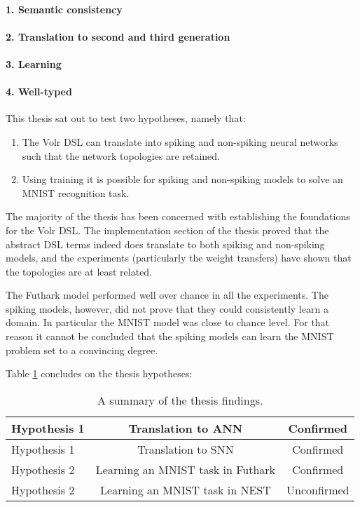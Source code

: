 \documentclass[report.tex]{subfiles}
\begin{document}
\paragraph{1. Semantic consistency}
\paragraph{2. Translation to second and third generation}
\paragraph{3. Learning}
\paragraph{4. Well-typed}

This thesis sat out to test two hypotheses, namely that:

\begin{enumerate}
  \item The Volr DSL can translate into spiking and non-spiking neural networks such that the network topologies are retained.
  \item Using training it is possible for spiking and non-spiking models to solve an MNIST recognition task.
\end{enumerate}

The majority of the thesis has been concerned with establishing the foundations
for the Volr \gls{DSL}. 
The implementation section of the thesis proved that the abstract \gls{DSL}
terms indeed does translate to both spiking and non-spiking models, and the
experiments (particularly the weight transfers)
have shown that the topologies are at least related. 

The Futhark model performed well over chance in all the experiments.
The spiking models, however, did not prove that they could consistently learn a
domain. 
In particular the MNIST model was close to chance level.
For that reason it cannot be concluded that the spiking models can learn the
MNIST problem set to a convincing degree.

Table \ref{tab:findings} concludes on the thesis hypotheses:

\def\arraystretch{1.5}
\begin{table}
  \centering
  \begin{tabular}{l c c}
     Hypothesis 1 & Translation to \gls{ANN} & Confirmed \\ \hline
     Hypothesis 1 & Translation to \gls{SNN} & Confirmed \\ \hline
     Hypothesis 2 & Learning an MNIST task in Futhark & Confirmed \\ \hline
     Hypothesis 2 & Learning an MNIST task in NEST & Unconfirmed \\ \hline
  \end{tabular}
  \caption{A summary of the thesis findings.}
  \label{tab:findings}
\end{table}
\end{document}
